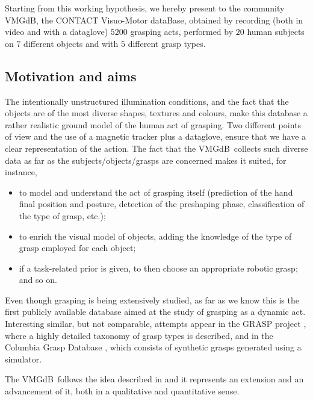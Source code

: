 \documentclass{article}
\newcommand{\db}{\textsf{VMGdB}}
\begin{document}
Starting from this working hypothesis, we hereby present to the community
\db, the CONTACT Visuo-Motor dataBase, obtained by recording (both in video
and with a dataglove) $5200$ grasping acts, performed by $20$ human subjects on
$7$ different objects and with $5$ different grasp types.

\subsection{Motivation and aims}

The intentionally unstructured illumination conditions, and the fact that the
objects are of the most diverse shapes, textures and colours, make this database
a rather realistic ground model of the human act of grasping. Two different
points of view and the use of a magnetic tracker plus a dataglove, ensure that
we have a clear representation of the action. The fact that the \db\ collects
such diverse data as far as the subjects/objects/grasps are concerned makes it
suited, for instance,

\begin{itemize}

\item to model and understand the act of grasping itself (prediction of the hand
      final position and posture, detection of the preshaping phase, classification
      of the type of grasp, etc.);

\item to enrich the visual model of objects, adding the knowledge of the type of
      grasp employed for each object;

\item if a task-related prior is given, to then choose an appropriate robotic
      grasp; and so on.

\end{itemize}

Even though grasping is being extensively studied, as far as we know
this is the first publicly available database aimed at the study of grasping as a
dynamic act. Interesting similar, but not comparable, attempts appear in the
GRASP project \cite{grasp_project}, where a highly detailed taxonomy of grasp
types is described, and in the Columbia Grasp Database \cite{GoldfederAl09}, which
consists of synthetic grasps generated using a simulator.

The \db\ follows the idea described in \cite{lopes-05,metta-06} and
it represents an extension and an advancement of it, both in a
qualitative and quantitative sense.
\end{document}
